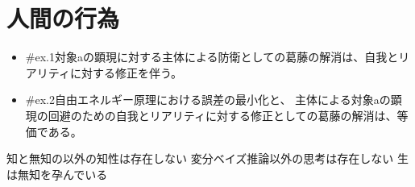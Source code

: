 \section{人間の行為}\label{ux4ebaux9593ux306eux884cux70ba}

\begin{note}{}
  \begin{itemize}
    \tightlist
    \item{\#ex.1}対象aの顕現に対する主体による防衛としての葛藤の解消は、自我とリアリティに対する修正を伴う。
    \item{\#ex.2}自由エネルギー原理における誤差の最小化と、  主体による対象aの顕現の回避のための自我とリアリティに対する修正としての葛藤の解消は、等価である。
  \end{itemize}
\end{note}

知と無知の以外の知性は存在しない
変分ベイズ推論以外の思考は存在しない 生は無知を孕んでいる
